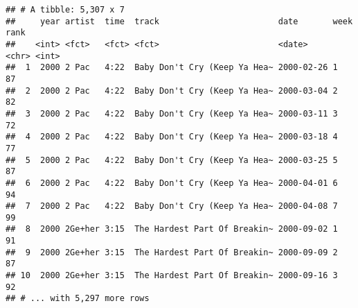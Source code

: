 \documentclass[]{article}
\begin{document}
\begin{verbatim}
## # A tibble: 5,307 x 7
##     year artist  time  track                        date       week   rank
##    <int> <fct>   <fct> <fct>                        <date>     <chr> <int>
##  1  2000 2 Pac   4:22  Baby Don't Cry (Keep Ya Hea~ 2000-02-26 1        87
##  2  2000 2 Pac   4:22  Baby Don't Cry (Keep Ya Hea~ 2000-03-04 2        82
##  3  2000 2 Pac   4:22  Baby Don't Cry (Keep Ya Hea~ 2000-03-11 3        72
##  4  2000 2 Pac   4:22  Baby Don't Cry (Keep Ya Hea~ 2000-03-18 4        77
##  5  2000 2 Pac   4:22  Baby Don't Cry (Keep Ya Hea~ 2000-03-25 5        87
##  6  2000 2 Pac   4:22  Baby Don't Cry (Keep Ya Hea~ 2000-04-01 6        94
##  7  2000 2 Pac   4:22  Baby Don't Cry (Keep Ya Hea~ 2000-04-08 7        99
##  8  2000 2Ge+her 3:15  The Hardest Part Of Breakin~ 2000-09-02 1        91
##  9  2000 2Ge+her 3:15  The Hardest Part Of Breakin~ 2000-09-09 2        87
## 10  2000 2Ge+her 3:15  The Hardest Part Of Breakin~ 2000-09-16 3        92
## # ... with 5,297 more rows
\end{verbatim}
\end{document}
